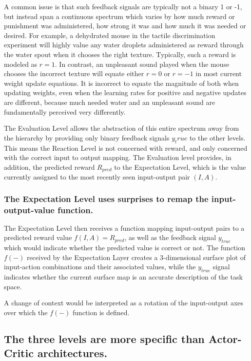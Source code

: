 \documentclass[]{article}
\begin{document}
A common issue is that such feedback signals are typically not a binary 1 or -1, but instead span a continuous spectrum which varies by how much reward or punishment was administered, how strong it was and how much it was needed or desired.  For example, a dehydrated mouse in the tactile discrimination experiment will highly value any water droplets administered as reward through the water spout when it chooses the right texture.  Typically, such a reward is modeled as $r = 1$.  In contrast, an unpleasant sound played when the mouse chooses the incorrect texture will equate either $r = 0$ or $r = -1$ in most current weight update equations.  It is incorrect to equate the magnitude of both when updating weights, even when the learning rates for positive and negative updates are different, because much needed water and an unpleasant sound are fundamentally perceived very differently.

The Evaluation Level allows the abstraction of this entire spectrum away from the hierarchy by providing only binary feedback signals $y_true$ to the other levels.  This means the Reaction Level is not concerned with reward, and only concerned with the correct input to output mapping.  The Evaluation level provides, in addition, the predicted reward $R_{pred}$ to the Expectation Level, which is the value currently assigned to the most recently seen input-output pair $(I, A)$.

\subsubsection{The Expectation Level uses surprises to remap the input-output-value function.}
The Expectation Level then receives a function mapping input-output pairs to a predicted reward value $f(I, A) = R_{pred}$, as well as the feedback signal $y_{true}$ which would indicate whether the predicted value is correct or not.  The function $f(-)$ received by the Expectation Layer creates a 3-dimensional surface plot of input-action combinations and their associated values, while the $y_{true}$ signal indicates whether the current surface map is an accurate description of the task space.

A change of context would be interpreted as a rotation of the input-output axes over which the $f(-)$ function is defined. 

\subsection{The three levels are more specific than Actor-Critic architectures.}
\end{document}
